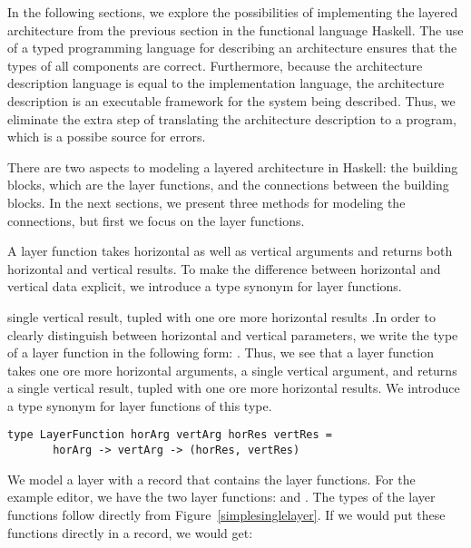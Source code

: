 \documentclass[preprint,natbib]{sigplanconf}
\begin{document}
In the following sections, we explore the possibilities of implementing the layered architecture from the previous section in the functional language Haskell. The use of a typed programming language for describing an architecture ensures that the types of all components are correct. Furthermore, because the architecture description language is equal to the implementation language, the architecture description is an executable framework for the system being described. Thus, we eliminate the extra step of translating the architecture description to a program, which is a possibe source for errors.


There are two aspects to modeling a layered architecture in Haskell: the building blocks, which are the layer functions, and the connections between the building blocks. In the next sections, we present three methods for modeling the connections, but first we focus on the layer functions. 

A layer function takes  horizontal as well as vertical arguments and returns both  horizontal and vertical results. To make the difference between horizontal and vertical data explicit, we introduce a type synonym for layer functions.

\bc single vertical result, tupled with one ore more horizontal results .In order to clearly distinguish between horizontal and vertical parameters, we write the type of a layer function in the following form: . Thus, we see that a layer function takes one ore more horizontal arguments, a single vertical argument, and returns a single vertical result, tupled with one ore more horizontal results. We introduce a type synonym for layer functions of this type. \ec


\begin{small}
\begin{verbatim}
type LayerFunction horArg vertArg horRes vertRes =
       horArg -> vertArg -> (horRes, vertRes)
\end{verbatim}
\end{small}

We model a layer with a record that contains the layer functions. For the example editor, we have the two layer functions:  and . The types of the layer functions follow directly from Figure~\ref{simplesinglelayer}.  If we would put these functions directly in a record, we would get:
\end{document}
